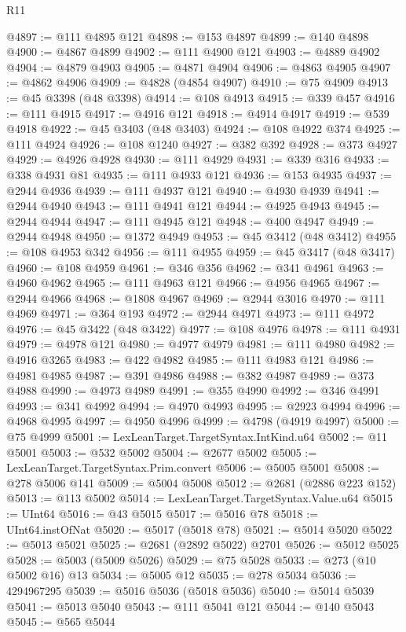 \begin{lexlean}{R11}
\begin{coremodule}
@4897 := @111 @4895 @121
@4898 := @153 @4897
@4899 := @140 @4898
@4900 := @4867 @4899
@4902 := @111 @4900 @121
@4903 := @4889 @4902
@4904 := @4879 @4903
@4905 := @4871 @4904
@4906 := @4863 @4905
@4907 := @4862 @4906
@4909 := @4828 (@4854 @4907)
@4910 := @75 @4909
@4913 := @45 @3398 (@48 @3398)
@4914 := @108 @4913
@4915 := @339 @457
@4916 := @111 @4915
@4917 := @4916 @121
@4918 := @4914 @4917
@4919 := @539 @4918
@4922 := @45 @3403 (@48 @3403)
@4924 := @108 @4922 @374
@4925 := @111 @4924
@4926 := @108 @1240
@4927 := @382 @392
@4928 := @373 @4927
@4929 := @4926 @4928
@4930 := @111 @4929
@4931 := @339 @316
@4933 := @338 @4931 @81
@4935 := @111 @4933 @121
@4936 := @153 @4935
@4937 := @2944 @4936
@4939 := @111 @4937 @121
@4940 := @4930 @4939
@4941 := @2944 @4940
@4943 := @111 @4941 @121
@4944 := @4925 @4943
@4945 := @2944 @4944
@4947 := @111 @4945 @121
@4948 := @400 @4947
@4949 := @2944 @4948
@4950 := @1372 @4949
@4953 := @45 @3412 (@48 @3412)
@4955 := @108 @4953 @342
@4956 := @111 @4955
@4959 := @45 @3417 (@48 @3417)
@4960 := @108 @4959
@4961 := @346 @356
@4962 := @341 @4961
@4963 := @4960 @4962
@4965 := @111 @4963 @121
@4966 := @4956 @4965
@4967 := @2944 @4966
@4968 := @1808 @4967
@4969 := @2944 @3016
@4970 := @111 @4969
@4971 := @364 @193
@4972 := @2944 @4971
@4973 := @111 @4972
@4976 := @45 @3422 (@48 @3422)
@4977 := @108 @4976
@4978 := @111 @4931
@4979 := @4978 @121
@4980 := @4977 @4979
@4981 := @111 @4980
@4982 := @4916 @3265
@4983 := @422 @4982
@4985 := @111 @4983 @121
@4986 := @4981 @4985
@4987 := @391 @4986
@4988 := @382 @4987
@4989 := @373 @4988
@4990 := @4973 @4989
@4991 := @355 @4990
@4992 := @346 @4991
@4993 := @341 @4992
@4994 := @4970 @4993
@4995 := @2923 @4994
@4996 := @4968 @4995
@4997 := @4950 @4996
@4999 := @4798 (@4919 @4997)
@5000 := @75 @4999
@5001 := LexLeanTarget.TargetSyntax.IntKind.u64
@5002 := @11 @5001
@5003 := @532 @5002
@5004 := @2677 @5002
@5005 := LexLeanTarget.TargetSyntax.Prim.convert
@5006 := @5005 @5001
@5008 := @278 @5006 @141
@5009 := @5004 @5008
@5012 := @2681 (@2886 @223 @152)
@5013 := @113 @5002
@5014 := LexLeanTarget.TargetSyntax.Value.u64
@5015 := UInt64
@5016 := @43 @5015
@5017 := @5016 @78
@5018 := UInt64.instOfNat
@5020 := @5017 (@5018 @78)
@5021 := @5014 @5020
@5022 := @5013 @5021
@5025 := @2681 (@2892 @5022) @2701
@5026 := @5012 @5025
@5028 := @5003 (@5009 @5026)
@5029 := @75 @5028
@5033 := @273 (@10 @5002 @16) @13
@5034 := @5005 @12
@5035 := @278 @5034
@5036 := 4294967295
@5039 := @5016 @5036 (@5018 @5036)
@5040 := @5014 @5039
@5041 := @5013 @5040
@5043 := @111 @5041 @121
@5044 := @140 @5043
@5045 := @565 @5044

\end{coremodule}
\end{lexlean}
